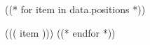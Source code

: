 \sectionsep
\begin{tightemize}
((* for item in data.positions *))
\item ((( item )))
((* endfor *))
\end{tightemize}
\sectionsep